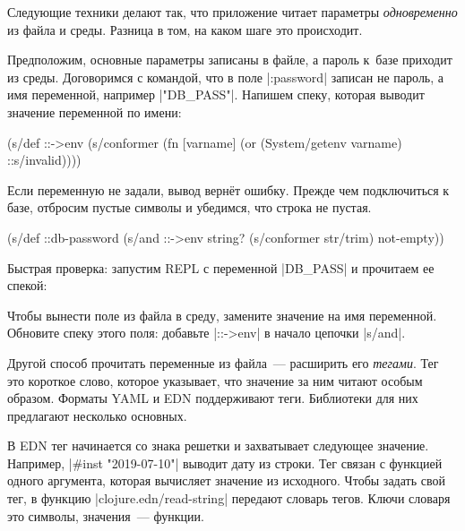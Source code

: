 Следующие техники делают так, что приложение читает параметры
\emph{одновременно} из файла и среды. Разница в том, на каком шаге это
происходит.

Предположим, основные параметры записаны в файле, а пароль к~базе приходит из
среды. Договоримся с командой, что в поле \spverb|:password| записан не пароль,
а имя переменной, например \spverb|"DB_PASS"|. Напишем спеку, которая выводит
значение переменной по имени:

\begin{english}
  \begin{clojure}
(s/def ::->env
  (s/conformer
   (fn [varname]
     (or (System/getenv varname)
         ::s/invalid))))
  \end{clojure}
\end{english}

Если переменную не задали, вывод верн\"{е}т ошибку. Прежде чем подключиться к базе,
отбросим пустые символы и убедимся, что строка не пустая.

\begin{english}
  \begin{clojure}
(s/def ::db-password
  (s/and ::->env
         string?
         (s/conformer str/trim)
         not-empty))
  \end{clojure}
\end{english}

Быстрая проверка: запустим REPL с переменной \spverb|DB_PASS| и прочитаем ее
спекой:

\begin{english}
  \begin{bash}
DB_PASS='*(&fd}A53z#$!' lein repl

(s/conform ::db-password "DB_PASS")
"*(&fd}A53z#$!"
  \end{bash}
\end{english}

Чтобы вынести поле из файла в среду, замените значение на имя
переменной. Обновите спеку этого поля: добавьте \spverb|::->env| в начало
цепочки \spverb|s/and|.

Другой способ прочитать переменные из файла~--- расширить его \emph{тегами}. Тег
это короткое слово, которое указывает, что значение за ним читают особым
образом. Форматы YAML и EDN поддерживают теги. Библиотеки для них предлагают
несколько основных.

В EDN тег начинается со знака решетки и захватывает следующее
значение. Например, \spverb|#inst "2019-07-10"| выводит дату из строки. Тег
связан с функцией одного аргумента, которая вычисляет значение из
исходного. Чтобы задать свой тег, в функцию \spverb|clojure.edn/read-string|
передают словарь тегов. Ключи словаря это символы, значения~--- функции.

